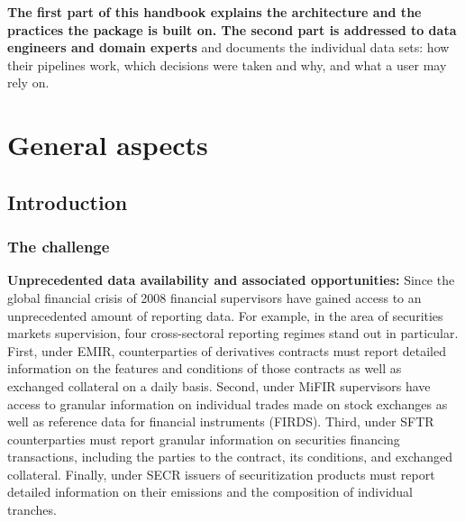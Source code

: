 \documentclass[a4paper, 11pt]{report}
\begin{document}
\textbf{The first part of this handbook explains the architecture and the practices the package is built on. The second part is addressed to data engineers and domain experts} and documents the individual data sets: how their pipelines work, which decisions were taken and why, and what a user may rely on.

\tableofcontents


\part{General aspects\label{part:general}}

\chapter{Introduction}

\section{The challenge\label{sec:intro-challenge}}

\textbf{Unprecedented data availability and associated opportunities:} Since the global financial crisis of 2008 financial supervisors have gained access to an unprecedented amount of reporting data. For example, in the area of securities markets supervision, four cross-sectoral reporting regimes stand out in particular. First, under EMIR, counterparties of derivatives contracts must report detailed information on the features and conditions of those contracts as well as exchanged collateral on a daily basis. Second, under MiFIR supervisors have access to granular information on individual trades made on stock exchanges as well as reference data for financial instruments (FIRDS). Third, under SFTR counterparties must report granular information on securities financing transactions, including the parties to the contract, its conditions, and exchanged collateral. Finally, under SECR issuers of securitization products must report detailed information on their emissions and the composition of individual tranches.
\end{document}

